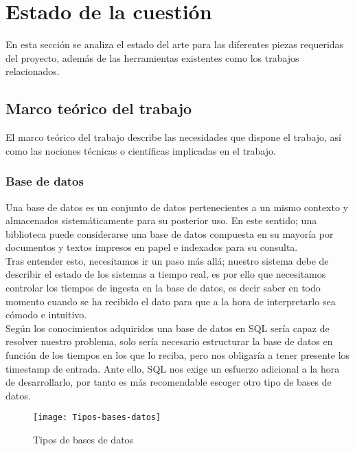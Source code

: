 \documentclass[ spanish, a4paper, 12pt, oneside]{report}
\begin{document}
\chapter{Estado de la cuestión}

En esta sección se analiza el estado del arte para las diferentes piezas requeridas del proyecto, además de las herramientas existentes 
como los trabajos relacionados.\\


\section{Marco teórico del trabajo}
El marco teórico del trabajo describe las necesidades que dispone el trabajo, así como las nociones técnicas o científicas implicadas en el 
trabajo.\\

\subsection{Base de datos}
Una base de datos es un conjunto de datos pertenecientes a un mismo contexto y almacenados sistemáticamente para su posterior uso. En este sentido; 
una biblioteca puede considerarse una base de datos compuesta en su mayoría por documentos y textos impresos en papel e indexados para su consulta.\\

Tras entender esto, necesitamos ir un paso más allá; nuestro sistema debe de describir el estado de los sistemas a tiempo real, es por ello que necesitamos 
controlar los tiempos de ingesta en la base de datos, es decir saber en todo momento cuando se ha recibido el dato para que a la hora de interpretarlo 
sea cómodo e intuitivo.\\

Según los conocimientos adquiridos una base de datos en SQL sería capaz de resolver nuestro problema, solo sería necesario estructurar la base de datos en 
función de los tiempos en los que lo reciba, pero nos obligaría a tener presente los timestamp de entrada. Ante ello, SQL nos exige un esfuerzo adicional a la hora de 
desarrollarlo, por tanto es más recomendable escoger otro tipo de bases de datos. \\

\begin{figure}[!h]
   \centering
   \texttt{[image: Tipos-bases-datos]}\\
      \caption{\label{fig: Tipos de bases de datos} Tipos de bases de datos}
\end{figure}
\end{document}
